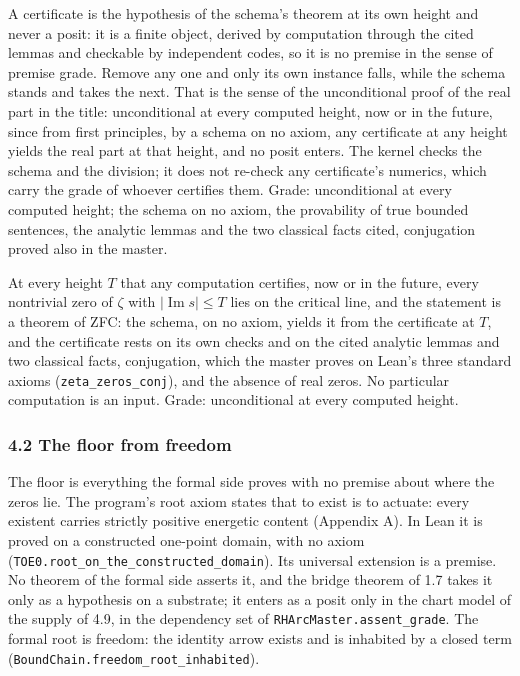 \documentclass[10pt]{article}
\newenvironment{jbox}[2]{\par\vspace{7pt}\noindent{\color{accent}\rule{\linewidth}{0.8pt}}\par\nopagebreak[4]\vspace{1pt}%
  \noindent{\small\bfseries{\color{accent}Box #1}\enspace\textbar\enspace{\color{deep}#2}}\par\nopagebreak[4]\vspace{2pt}\small\setlength{\parindent}{0pt}\setlength{\parskip}{3pt}}%
  {\par\vspace{2pt}\noindent{\color{accent!45}\rule{\linewidth}{0.4pt}}\par\vspace{7pt}}
\begin{document}
A certificate is the hypothesis of the schema's theorem at its own
height and never a posit: it is a finite object, derived by computation
through the cited lemmas and checkable by independent codes, so it is no
premise in the sense of premise grade. Remove any one and only its own
instance falls, while the schema stands and takes the next. That is the
sense of the unconditional proof of the real part in the title:
unconditional at every computed height, now or in the future, since from
first principles, by a schema on no axiom, any certificate at any height
yields the real part at that height, and no posit enters. The kernel
checks the schema and the division; it does not re-check any
certificate's numerics, which carry the grade of whoever certifies them.
Grade: unconditional at every computed height; the schema on no axiom,
the provability of true bounded sentences, the analytic lemmas and the
two classical facts cited, conjugation proved also in the master.

\begin{jbox}{2}{The real part, proved}

At every height \(T\) that any computation certifies, now or in the
future, every nontrivial zero of \(\zeta\) with
\(|\operatorname{Im} s| \le T\) lies on the critical line, and the
statement is a theorem of ZFC: the schema, on no axiom, yields it from
the certificate at \(T\), and the certificate rests on its own checks
and on the cited analytic lemmas and two classical facts, conjugation,
which the master proves on Lean's three standard axioms
(\texttt{zeta\_\allowbreak{}zeros\_\allowbreak{}conj}), and the absence
of real zeros. No particular computation is an input. Grade:
unconditional at every computed height.

\end{jbox}

\hypertarget{the-floor-from-freedom}{%
\subsubsection{4.2 The floor from
freedom}\label{the-floor-from-freedom}}

The floor is everything the formal side proves with no premise about
where the zeros lie. The program's root axiom states that to exist is to
actuate: every existent carries strictly positive energetic content
(Appendix A). In Lean it is proved on a constructed one-point domain,
with no axiom
(\texttt{TOE0.\allowbreak{}root\_\allowbreak{}on\_\allowbreak{}the\_\allowbreak{}constructed\_\allowbreak{}domain}).
Its universal extension is a premise. No theorem of the formal side
asserts it, and the bridge theorem of 1.7 takes it only as a hypothesis
on a substrate; it enters as a posit only in the chart model of the
supply of 4.9, in the dependency set of
\texttt{RHArcMaster.\allowbreak{}assent\_\allowbreak{}grade}. The formal
root is freedom: the identity arrow exists and is inhabited by a closed
term
(\texttt{BoundChain.\allowbreak{}freedom\_\allowbreak{}root\_\allowbreak{}inhabited}).
\end{document}
